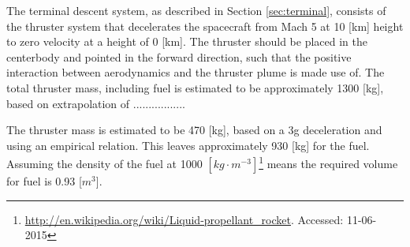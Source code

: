 The terminal descent system, as described in Section \ref{sec:terminal}, consists of the thruster system that decelerates the spacecraft from Mach 5 at 10 [km] height to zero velocity at a height of 0 [km]. The thruster should be placed in the centerbody and pointed in the forward direction, such that the positive interaction between aerodynamics and the thruster plume is made use of. The total thruster mass, including fuel is estimated to be approximately 1300 [kg], based on extrapolation of .................

The thruster mass is estimated to be 470 [kg], based on a 3g deceleration and using an empirical relation\cite{Christian2006}. This leaves approximately 930 [kg] for the fuel. Assuming the density of the fuel at 1000 $[kg\cdot m^{-3}]$\footnote{\url{http://en.wikipedia.org/wiki/Liquid-propellant_rocket}. Accessed: 11-06-2015} means the required volume for fuel is 0.93 [$m^3$].